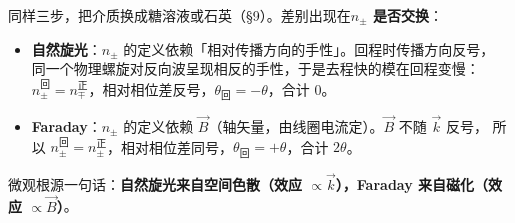 \documentclass[11pt]{ctexart}
\let\subhdrtheme\subhdr
\renewcommand{\subhdr}[1]{\needspace{3\baselineskip}\subhdrtheme{#1}}
\begin{document}


同样三步，把介质换成糖溶液或石英（§9）。差别出现在\textbf{$n_\pm$ 是否交换}：

\begin{itemize}
\item \textbf{自然旋光}：$n_\pm$ 的定义依赖「相对传播方向的手性」。回程时传播方向反号，
      同一个物理螺旋对反向波呈现相反的手性，于是去程快的模在回程变慢：
      $n_\pm^{\text{回}}=n_\mp^{\text{正}}$，相对相位差反号，$\theta_{\text{回}}=-\theta$，合计 $0$。
\item \textbf{Faraday}：$n_\pm$ 的定义依赖 $\vec B$（轴矢量，由线圈电流定）。$\vec B$ 不随 $\vec k$ 反号，
      所以 $n_\pm^{\text{回}}=n_\pm^{\text{正}}$，相对相位差同号，$\theta_{\text{回}}=+\theta$，合计 $2\theta$。
\end{itemize}

微观根源一句话：\textbf{自然旋光来自空间色散（效应 $\propto\vec k$），Faraday 来自磁化（效应 $\propto\vec B$）}。
\end{document}
